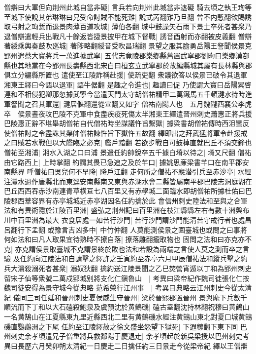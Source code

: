 僧辯曰大軍但向荆州此城自當非礙|{
	言兵若向荆州此城當非遮礙}
騎去頃之執王珣等至城下使說其弟琳琳曰兄受命討賊不能死難|{
	說式芮翻難乃旦翻}
曾不内慙翻欲賜誘取弓射之珣慙而退景肉薄百道攻城|{
	薄伯各翻}
城中鼓譟矢石雨下景士卒死者甚衆乃退僧辯遣輕兵出戰凡十餘返皆捷景披甲在城下督戰|{
	誘音酉射而亦翻被皮義翻}
僧辯著綬乘輿奏鼓吹廵城|{
	著陟略翻綬音受吹昌瑞翻}
景望之服其膽勇岳陽王詧聞侯景克郢州遣蔡大寶將兵一萬進據武寧|{
	五代志竟陵郡樂鄉縣舊置武寧郡劉昫曰樂鄉漢鄀縣也其地當在今郢州長壽縣西北宋白曰桓玄立武寧郡於故編縣城其屬有長林縣與郡俱立分編縣所置也}
遣使至江陵詐稱赴援|{
	使疏吏翻}
衆議欲答以侯景已破令其退軍湘東王繹曰今語以退軍|{
	語牛倨翻}
是趣之令進也|{
	趣讀曰促}
乃使謂大寶曰岳陽累啓連和不相侵犯卿那忽據武寧今當遣天門太守胡僧祐精甲二萬鐵馬五千頓湕水待時進軍詧聞之召其軍還|{
	湕居偃翻還從宣翻又如字}
僧祐南陽人也　五月魏隴西襄公李虎卒　侯景晝夜攻巴陵不克軍中食盡疾疫死傷太半湘東王繹遣晉州刺史蕭惠正將兵援巴陵惠正辭不堪舉胡僧祐自代僧祐時坐謀議忤旨繫獄|{
	據梁書胡僧祐傳時西沮蠻反使僧祐討之令盡誅其渠帥僧祐諫忤旨下獄忤五故翻}
繹即出之拜武猛將軍令赴援戒之曰賊若水戰但以大艦臨之必克|{
	艦戶黯翻}
若欲步戰自可鼓棹直就巴丘不須交鋒也僧祐至湘浦|{
	湘水入湖之口曰浦}
景遣任約帥銳卒五千據白塉以待之|{
	塉又尺翻}
僧祐由它路西上|{
	上時掌翻}
約謂其畏已急追之及於芊口|{
	據姚思亷梁書芊口在南平郡安南縣界}
呼僧祐曰吳兒何不早降|{
	降戶江翻}
走何所之僧祐不應潜引兵至赤沙亭|{
	水經注灃水過作唐縣北而東逕安南縣南又東與赤湖水會二縣皆屬南平郡巴陵志洞庭湖在巴丘西西吞赤沙南連青草横亘七八百里又有赤學城二面臨水即胡僧祐所據杜佑曰巴陵郡西華容界有赤亭城城近赤亭湖因名任約擒於此}
會信州刺史陸法和至與之合軍法和有異術隱於江陵百里洲|{
	盛弘之荆州記曰百里洲在枝江縣縣左右有數十洲槃布川中百里洲為最大}
衣食居處一如苦行沙門|{
	苦行沙門謂沙門能清苦守戒行者也處昌呂翻行下孟翻}
或豫言吉凶多中|{
	中竹仲翻}
人莫能測侯景之圍臺城也或問之曰事將何如法和曰凡人取果宜待熟時不撩自落|{
	撩落雕翻攏取物也}
固問之法和曰亦克亦不克|{
	亦克謂侯景取臺城不克謂景終於敗也法和若設為兩端之言使人莫之測而卒之言驗}
及任約向江陵法和自請擊之繹許之壬寅約至赤亭六月甲辰僧祐法和縱兵擊之約兵大潰殺溺死者甚衆|{
	溺奴狄翻}
擒約送江陵景聞之乙巳焚營宵遁以丁和為郢州刺史留宋子仙等衆號二萬戍郢城别將支化仁鎭魯山　|{
	考異曰梁帝紀作魏司徒張化仁按魏司徒安得為景守城今從典略}
范希榮行江州事　|{
	考異曰典略云江州刺史今從太清紀}
儀同三司任延和晉州刺史夏侯威生守晉州|{
	梁於晉熙郡置晉州}
景與麾下兵數千順流而下丁和以大石磕殺鮑泉及虞預沈於黄鶴磯|{
	磕古盍翻沈持林翻祝穆曰黄鶴山一名黄鵠山在江夏縣東九里近縣西北二里有黄鶴磯水經注黄鵠山東北對夏口城黄鵠磯直鸚鵡洲之下尾}
任約至江陵繹赦之徐文盛坐怨望下獄死|{
	下遐稼翻下東下同}
巴州刺史余孝頃遣兄子僧重將兵救鄱陽于慶退走|{
	余孝頃起於新吳梁授以巴州刺史考異曰長歷六月癸卯朔太清紀一日慶走二日擒任約三日景走今從梁帝紀}
繹以王僧辯

